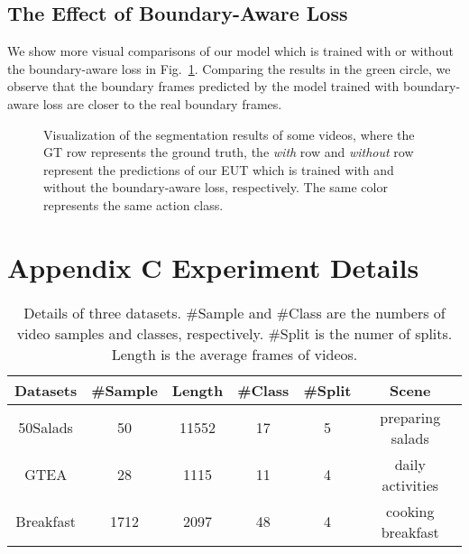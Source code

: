 \documentclass[letterpaper]{article} \usepackage[submission]{aaai23}  \usepackage{times}  \usepackage{helvet}  \usepackage{courier}  \usepackage[hyphens]{url}  \usepackage{graphicx} \urlstyle{rm} \def\UrlFont{\rm}  \usepackage{natbib}  \usepackage{caption} \frenchspacing  \setlength{\pdfpagewidth}{8.5in} \setlength{\pdfpageheight}{11in} \usepackage{algorithm}
\begin{document}
\subsection{The Effect of Boundary-Aware Loss}
We show more visual comparisons of our model which is trained with or without the boundary-aware loss in Fig.~\ref{fig:balosseffect}. Comparing the results in the green circle, we observe that the boundary frames predicted by the model trained with boundary-aware loss are closer to the real boundary frames.

\begin{figure}[ht]
\begin{center}
\caption{Visualization of the segmentation results of some videos, where the GT row represents the ground truth, the \textit{with} row and \textit{without} row represent the predictions of our EUT which is trained with and without the boundary-aware loss, respectively. The same color represents the same action class.}
\label{fig:balosseffect}
\end{center}
\end{figure}


\section{Appendix C Experiment Details}

\begin{table*}[t]
\centering
\begin{tabular}{cccccc}
    \toprule
    Datasets & \#Sample & Length & \#Class & \#Split & Scene \\
    \midrule
    50Salads & 50 & 11552 & 17 & 5 & preparing salads \\
    GTEA  & 28 & 1115 & 11 & 4 & daily activities \\
    Breakfast & 1712 & 2097 & 48 & 4& cooking breakfast \\
    \bottomrule
\end{tabular}
\caption{Details of three datasets. \#Sample and \#Class are the numbers of video samples and classes, respectively. \#Split is the numer of splits. Length is the average frames of videos.}
\label{tab:datasets}
\end{table*}
\end{document}
